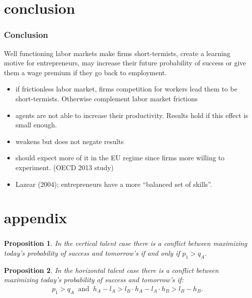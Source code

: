 \documentclass[slides,english,compress]{beamer}
\newtheorem{proposition}{Proposition}
\begin{document}
\section{conclusion}
\begin{frame}
	\frametitle{Conclusion}
Well functioning labor markets make firms  short-termists, create a learning motive for entrepreneurs, may increase their future probability of success or give them a wage premium  if they go back to employment.
\pause
\begin{itemize}[<+->]
	\item {} if frictionless labor market, firms competition for workers lead them to be short-termists. Otherwise complement labor market frictions
	\item {} agents are not able to increase their productivity. Results hold if this effect is small enough.
	\item {} weakens but does not negate results
	\item {} should expect more of it in the EU regime since firms more willing to experiment. (OECD 2013 study)
	\item {} Lazear (2004); entrepreneurs have a more ``balanced set of skills''.
	\end{itemize}

\end{frame}
%   
%    
\section{appendix}
\begin{frame}[label=mps]
	\frametitle{}
\begin{proposition}\label{prop:nsc_learning_vertical}
In the vertical talent case there is a conflict between maximizing today's probability of success and tomorrow's if and only if $p_1>q_A$.
\end{proposition}
%
%
\begin{proposition}\label{prop:nsc_learning_horizonthal}
In the horizontal talent case there is a conflict between maximizing today's probability of success and tomorrow's if:
\begin{align*}
p_1>q_A \;\;\mbox{and}\;\;h_A-l_A>l_B \cdot h_A-l_A \cdot h_B >l_B-h_B.
\end{align*}
\end{proposition}

\hyperlink{sigma2<5>}{}
\end{frame}

\end{document}
